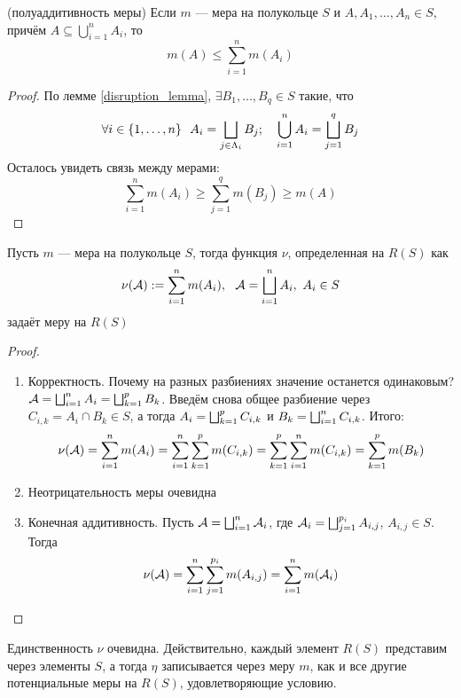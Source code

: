 \begin{lemma} (полуаддитивность меры)
	Если $m$ --- мера на полукольце $S$ и $A, A_1, \ldots, A_n \in S$, причём $A \subseteq \bigcup_{i = 1}^n A_i$, то
	\[
		m(A) \le \sum_{i = 1}^n m(A_i)
	\]
\end{lemma}

\begin{proof}
	По лемме \ref{disruption_lemma}, $\exists B_1, \ldots, B_q \in S$ такие, что
	\[
		\forall i \in \range{1}{n}\ \ A_i = \bscup_{j \in \Lambda_i} B_j; \quad \bigcup_{i = 1}^n A_i = \bscup_{j = 1}^q B_j
	\]
	Осталось увидеть связь между мерами:
	\[
		\sum_{i = 1}^n m(A_i) \ge \sum_{j = 1}^q m(B_j) \ge m(A)
	\]
\end{proof}

\begin{theorem}
	Пусть $m$ --- мера на полукольце $S$, тогда функция $\nu$, определенная на $R(S)$ как
	\[
		\nu(\cA) := \sum_{i = 1}^n m(A_i),\ \ \cA= \bscup_{i = 1}^n A_i,\ A_i \in S
	\]
	задаёт меру на $R(S)$
\end{theorem}

\begin{proof}~
	\begin{enumerate}
		\item Корректность. Почему на разных разбиениях значение останется одинаковым? $\mathcal{A} = \bigsqcup_{i = 1}^n A_i = \bigsqcup_{k = 1}^p B_k$. Введём снова общее разбиение через $C_{i, k} = A_i \cap B_k \in S$, а тогда $A_i = \bigsqcup_{k = 1}^p C_{i, k}$ и $B_k = \bigsqcup_{i = 1}^n C_{i, k}$. Итого:
		\[
			\nu(\mathcal{A}) = \sum_{i = 1}^n m(A_i) = \sum_{i = 1}^n \sum_{k = 1}^p m(C_{i, k}) = \sum_{k = 1}^p \sum_{i = 1}^n m(C_{i, k}) = \sum_{k = 1}^p m(B_k)
		\]
		
		\item Неотрицательность меры очевидна
		
		\item Конечная аддитивность. Пусть $\mathcal{A} = \bigsqcup_{i = 1}^n \mathcal{A}_i$, где $\mathcal{A}_i = \bigsqcup_{j = 1}^{p_i} A_{i, j}$, $A_{i, j} \in S$. Тогда
		\[
			\nu(\mathcal{A}) = \sum_{i = 1}^n \sum_{j = 1}^{p_i} m(A_{i, j}) = \sum_{i = 1}^n m(\mathcal{A}_i)
		\]
	\end{enumerate}
\end{proof}

\begin{note}
	Единственность $\nu$ очевидна. Действительно, каждый элемент $R(S)$ представим через элементы $S$, а тогда $\eta$ записывается через меру $m$, как и все другие потенциальные меры на $R(S)$, удовлетворяющие условию.
\end{note}

